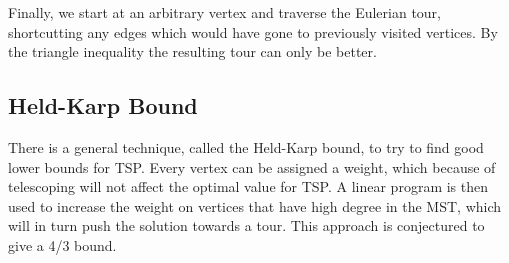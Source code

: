 \documentclass{article}
\begin{document}
Finally, we start at an arbitrary vertex and traverse the Eulerian
tour, shortcutting any edges which would have gone to previously
visited vertices. By the triangle inequality the resulting tour can
only be better.


\subsection{Held-Karp Bound}

There is a general technique, called the Held-Karp bound, to try to
find good lower bounds for TSP. Every vertex can be assigned a weight,
which because of telescoping will not affect the optimal value for
TSP. A linear program is then used to increase the weight on vertices
that have high degree in the MST, which will in turn push the solution
towards a tour. This approach is conjectured to give a 4/3 bound.
\end{document}
